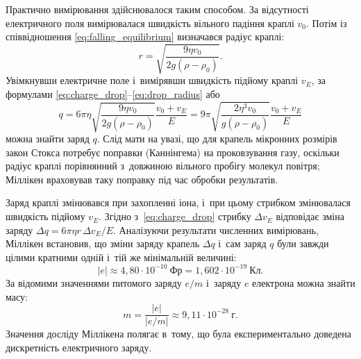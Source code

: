 Практично вимірювання здійснювалося таким способом. За відсутності електричного поля вимірювалася швидкість вільного падіння краплі $v_0$. Потім із співвідношення \eqref{eq:falling_equilibrium} визначався радіус краплі:
\begin{equation}\label{eq:drop_radius}
	r = \sqrt{\frac{9\eta v_0}{2g(\rho - \rho_0)}}.
\end{equation}
Увімкнувши електричне поле і~вимірявши швидкість підйому краплі $v_E$, за формулами \eqref{eq:charge_drop}--\eqref{eq:drop_radius} або
\begin{equation}\label{eq:charge_full}
	q = 6\pi\eta\sqrt{\frac{9\eta v_0}{2g(\rho - \rho_0)}}\frac{v_0 + v_E}{E}
	= 9\pi\sqrt{\frac{2\eta^3 v_0}{g(\rho - \rho_0)}}\frac{v_0 + v_E}{E}
\end{equation}
можна знайти заряд $q$. Слід мати на увазі, що для крапель мікронних розмірів закон Стокса потребує поправки (Каннінгема) на проковзування газу, оскільки радіус краплі порівнянний з~довжиною вільного пробігу молекул повітря; Міллікен враховував таку поправку під час обробки результатів.

Заряд краплі змінювався при захопленні іона, і~при цьому стрибком змінювалася швидкість підйому $v_E$. Згідно з~\eqref{eq:charge_drop} стрибку $\Delta v_E$ відповідає зміна заряду $\Delta q = 6\pi\eta r\,\Delta v_E/E$. Аналізуючи результати численних вимірювань, Міллікен встановив, що зміни заряду крапель $\Delta q$ і~сам заряд $q$ були завжди цілими кратними одній і~тій же мінімальній величині:
\begin{equation}\label{eq:elementary_charge}
	|e| \approx 4{,}80 \cdot 10^{-10} \ \text{Фр} = 1{,}602 \cdot 10^{-19} \ \text{Кл}.
\end{equation}
За відомими значеннями питомого заряду $e/m$ і~заряду $e$ електрона можна знайти масу:
\begin{equation}\label{eq:electron_mass}
	m = \frac{|e|}{|e/m|} \approx 9{,}11 \cdot 10^{-28} \ \text{г}.
\end{equation}
Значення досліду Міллікена полягає в~тому, що була експериментально доведена дискретність електричного заряду.


